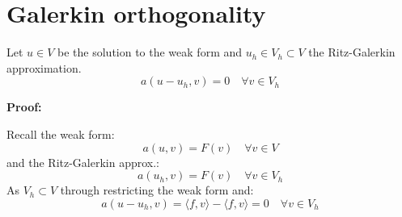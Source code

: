 \section*{Galerkin orthogonality}
Let $u \in V$ be the solution to the weak form and $u_h \in V_h \subset V$ the Ritz-Galerkin approximation.
\[
    a(u - u_h, v) = 0 \quad \forall v \in V_h
\]

\textbf{Proof:}

Recall the weak form:
\[
    a(u, v) = F(v) \quad \forall v \in V
\]
and the Ritz-Galerkin approx.:
\[
    a(u_h, v) = F(v) \quad \forall v \in V_h
\]
As $V_h \subset V$ through restricting the weak form and:
\[
    a(u - u_h, v) = \langle f, v \rangle - \langle f, v \rangle = 0 \quad \forall v \in V_h
\]
